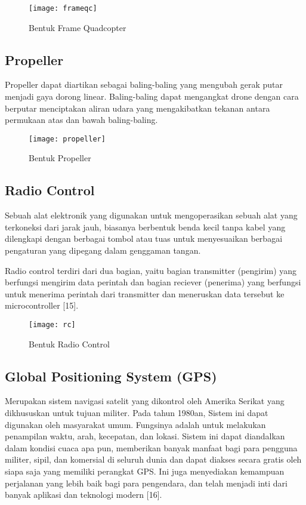 \begin{figure}[H]
	\centering
	\texttt{[image: frameqc]}
	\caption{Bentuk Frame Quadcopter}
	\label{fig:frame}
\end{figure}

\subsection{Propeller}
Propeller dapat diartikan sebagai baling-baling yang mengubah gerak putar menjadi gaya dorong linear. Baling-baling dapat mengangkat drone dengan cara berputar menciptakan aliran udara yang mengakibatkan tekanan antara permukaan atas dan bawah baling-baling.

\begin{figure}[H]
	\centering
	\texttt{[image: propeller]}
	\caption{Bentuk Propeller}
	\label{fig:propeller}
\end{figure}

\subsection{Radio Control}
Sebuah alat elektronik yang digunakan untuk mengoperasikan sebuah alat yang terkoneksi dari jarak jauh, biasanya berbentuk benda kecil tanpa kabel yang dilengkapi dengan berbagai tombol atau tuas untuk menyesuaikan berbagai pengaturan yang dipegang dalam genggaman tangan.

Radio control terdiri dari dua bagian, yaitu bagian transmitter (pengirim) yang berfungsi mengirim data perintah dan bagian reciever (penerima) yang berfungsi untuk menerima perintah dari transmitter dan meneruskan data tersebut ke microcontroller [15].

\begin{figure}[H]
	\centering
	\texttt{[image: rc]}
	\caption{Bentuk Radio Control}
	\label{fig:rc}
\end{figure}

\subsection{Global Positioning System (GPS) }
Merupakan sistem navigasi satelit yang dikontrol oleh Amerika Serikat yang dikhususkan untuk tujuan militer. Pada tahun 1980an, Sistem ini dapat digunakan oleh masyarakat umum. Fungsinya adalah untuk melakukan penampilan waktu, arah, kecepatan, dan lokasi. Sistem ini dapat diandalkan dalam kondisi cuaca apa pun, memberikan banyak manfaat bagi para pengguna militer, sipil, dan komersial di seluruh dunia dan dapat diakses secara gratis oleh siapa saja yang memiliki perangkat GPS. Ini juga menyediakan kemampuan perjalanan yang lebih baik bagi para pengendara, dan telah menjadi inti dari banyak aplikasi dan teknologi modern [16].

